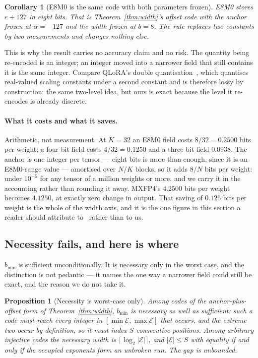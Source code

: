 \documentclass[11pt]{article}
\newtheorem{proposition}[theorem]{Proposition}
\newtheorem{corollary}{Corollary}
\theoremstyle{definition}
\begin{document}
\begin{corollary}[E8M0 is the same code with both parameters frozen]
\label{cor:e8m0}
E8M0 stores $e + 127$ in eight bits. That is Theorem~\ref{thm:width}'s offset
code with the anchor frozen at $\alpha = -127$ and the width frozen at $b = 8$.
The rule replaces two constants by two measurements and changes nothing else.
\end{corollary}

This is why the result carries no accuracy claim and no risk. The quantity being
re-encoded is an integer; an integer moved into a narrower field that still
contains it is the same integer. Compare QLoRA's double quantisation~\cite{qlora},
which quantises real-valued scaling constants under a second constant and is
therefore lossy by construction: the same two-level idea, but ours is exact
because the level it re-encodes is already discrete.

\paragraph{What it costs and what it saves.} Arithmetic, not measurement. At
$K=32$ an E8M0 field costs $8/32 = 0.2500$ bits per weight; a four-bit field
costs $4/32 = 0.1250$ and a three-bit field $0.0938$. The anchor is one
integer per tensor --- eight bits is more than enough, since it is an E8M0-range
value --- amortised over $N/K$ blocks, so it adds $8/N$ bits per weight: under
$10^{-5}$ for any tensor of a million weights or more, and we carry it in the
accounting rather than rounding it away. MXFP4's $4.2500$ bits per weight
becomes $4.1250$, at exactly zero change in output. That saving of $0.125$ bits
per weight is the whole of the width axis, and it is the one figure in this
section a reader should attribute to~\cite{chhugani} rather than to us.

\subsection{Necessity fails, and here is where}
\label{sec:widthnec}

$b_{\min}$ is sufficient unconditionally. It is necessary only in the worst
case, and the distinction is not pedantic --- it names the one way a narrower
field could still be exact, and the reason we do not take it.

\begin{proposition}[Necessity is worst-case only]
\label{prop:necessity}
Among codes of the anchor-plus-offset form of Theorem~\ref{thm:width},
$b_{\min}$ is necessary as well as sufficient: such a code must reach every
integer in $[\min\mathcal{E}, \max\mathcal{E}]$ that occurs, and the extreme two
occur by definition, so it must index $S$ consecutive positions. Among arbitrary
injective codes the necessary width is $\lceil \log_2 |\mathcal{E}| \rceil$,
and $|\mathcal{E}| \le S$ with equality if and only if the occupied exponents
form an unbroken run. The gap is unbounded.
\end{proposition}
\end{document}
